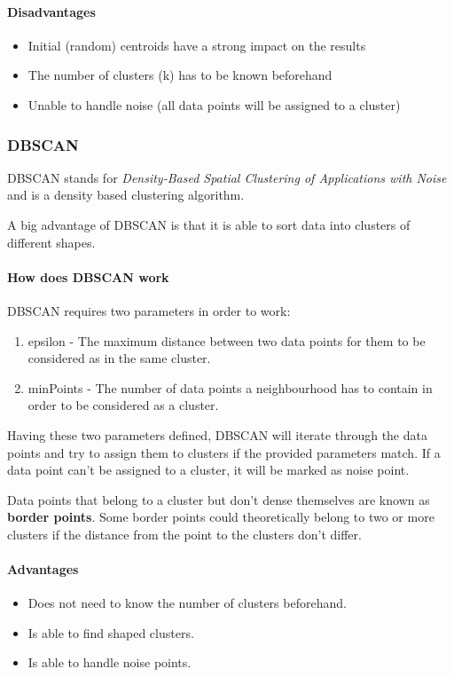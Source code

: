 \paragraph{Disadvantages}
\begin{itemize}
    \item Initial (random) centroids have a strong impact on the results
    \item The number of clusters (k) has to be known beforehand
    \item Unable to handle noise (all data points will be assigned to a cluster)
\end{itemize}

\subsubsection{DBSCAN}
DBSCAN stands for \textit{Density-Based Spatial Clustering of Applications with Noise}
and is a density based clustering algorithm.

A big advantage of DBSCAN is that it is able to sort data into clusters
of different shapes.

\paragraph{How does DBSCAN work}
DBSCAN requires two parameters in order to work:

\begin{enumerate}
    \item epsilon - The maximum distance between two data points for them to be considered as in the same cluster.
    \item minPoints - The number of data points a neighbourhood has to contain in order to be considered as a cluster.
\end{enumerate}

Having these two parameters defined, DBSCAN will iterate through the data points
and try to assign them to clusters if the provided parameters match.
If a data point can't be assigned to a cluster, it will be marked as noise point.

Data points that belong to a cluster but don't dense themselves are known as \textbf{border points}.
Some border points could theoretically belong to two or more clusters
if the distance from the point to the clusters don't differ.

\paragraph{Advantages}
\begin{itemize}
    \item Does not need to know the number of clusters beforehand.
    \item Is able to find shaped clusters.
    \item Is able to handle noise points.
\end{itemize}

